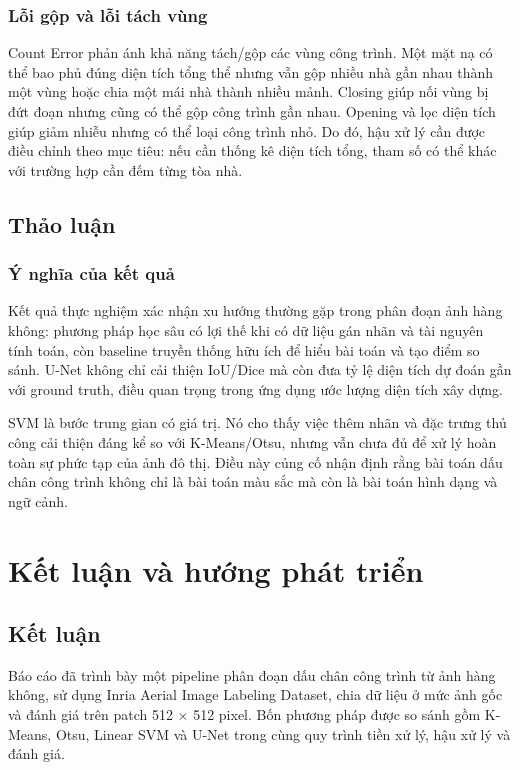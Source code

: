 \documentclass[12pt,a4paper]{report}
\begin{document}
\subsection{Lỗi gộp và lỗi tách vùng}

Count Error phản ánh khả năng tách/gộp các vùng công trình. Một mặt nạ có thể bao phủ đúng diện tích tổng thể nhưng vẫn gộp nhiều nhà gần nhau thành một vùng hoặc chia một mái nhà thành nhiều mảnh. Closing giúp nối vùng bị đứt đoạn nhưng cũng có thể gộp công trình gần nhau. Opening và lọc diện tích giúp giảm nhiễu nhưng có thể loại công trình nhỏ. Do đó, hậu xử lý cần được điều chỉnh theo mục tiêu: nếu cần thống kê diện tích tổng, tham số có thể khác với trường hợp cần đếm từng tòa nhà.

\section{Thảo luận}

\subsection{Ý nghĩa của kết quả}

Kết quả thực nghiệm xác nhận xu hướng thường gặp trong phân đoạn ảnh hàng không: phương pháp học sâu có lợi thế khi có dữ liệu gán nhãn và tài nguyên tính toán, còn baseline truyền thống hữu ích để hiểu bài toán và tạo điểm so sánh. U-Net không chỉ cải thiện IoU/Dice mà còn đưa tỷ lệ diện tích dự đoán gần với ground truth, điều quan trọng trong ứng dụng ước lượng diện tích xây dựng.

SVM là bước trung gian có giá trị. Nó cho thấy việc thêm nhãn và đặc trưng thủ công cải thiện đáng kể so với K-Means/Otsu, nhưng vẫn chưa đủ để xử lý hoàn toàn sự phức tạp của ảnh đô thị. Điều này củng cố nhận định rằng bài toán dấu chân công trình không chỉ là bài toán màu sắc mà còn là bài toán hình dạng và ngữ cảnh.

\chapter*{Kết luận và hướng phát triển}

\section*{Kết luận}

Báo cáo đã trình bày một pipeline phân đoạn dấu chân công trình từ ảnh hàng không, sử dụng Inria Aerial Image Labeling Dataset, chia dữ liệu ở mức ảnh gốc và đánh giá trên patch 512 $\times$ 512 pixel. Bốn phương pháp được so sánh gồm K-Means, Otsu, Linear SVM và U-Net trong cùng quy trình tiền xử lý, hậu xử lý và đánh giá.
\end{document}

